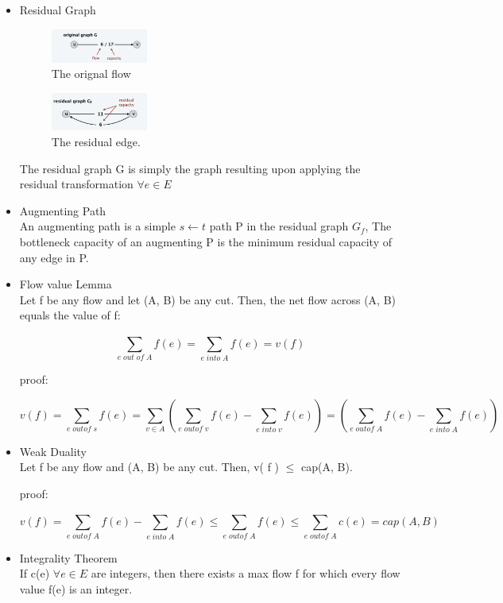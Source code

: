 \documentclass[11pt]{article}
\begin{document}
\begin{itemize}

\item{Residual Graph}

\begin{figure}[H]
		\centering
		\includegraphics[width=0.3\textwidth ]{residual2}
		\caption{The orignal flow}
\end{figure}

\begin{figure}[H]
		\centering
		\includegraphics[width=0.3\textwidth ]{residual1}
		\caption{The residual edge.}
\end{figure}

The residual graph G is simply the graph resulting upon applying the residual transformation $\forall e \in E$

\item{Augmenting Path}\\
An augmenting path is a simple $s \leftarrow t$ path P in the residual graph $G_{f}$, The bottleneck capacity of an augmenting P is the minimum residual capacity of any edge in P.

\item {Flow value Lemma}\\
Let f be any flow and let (A, B) be any cut. Then, the net flow across (A, B) equals the value of f:

\[ \sum_{e \; out \; of \; A}^{} f(e) = \sum_{e \; into \; A}^{} f(e) = v(f)\]

proof:

\[v(f) = \sum_{e \; outof  \; s}^{} f(e) =  \sum_{v \in A}^{} ( \sum_{e \; out of  \; v}^{} f(e) - \sum_{e \; into  \; v}^{} f(e)) =  ( \sum_{e \; out of  \; A}^{} f(e) - \sum_{e \; into  \; A}^{} f(e))\]

\item {Weak Duality}\\
Let f be any flow and (A, B) be any cut. Then, v( f ) $\leq$ cap(A, B).

proof:

\[v(f) =  \sum_{e \; out of  \; A}^{} f(e) - \sum_{e \; into  \; A}^{} f(e) \leq  \sum_{e \; out of  \; A}^{} f(e) \leq \sum_{e \; out of  \; A}^{} c(e) = cap(A,B)\]

\item {Integrality Theorem}\\
If c(e) $\forall e \in E$ are integers, then there exists a max flow f for which every flow value f(e) is an integer.

\end{itemize}
\end{document}
